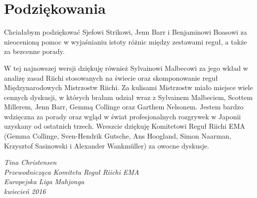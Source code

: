\section*{Podziękowania}

Chciałabym podziękować Sjefowi Strikowi, Jenn Barr i Benjaminowi Boasowi za nieocenioną pomoc w wyjaśnianiu istoty różnic między zestawami reguł, a także za bezcenne porady.

W tej najnowszej wersji dziękuję również Sylvainowi Malbecowi za jego wkład w analizę zasad Riichi stosowanych na świecie oraz skomponowanie reguł Międzynarodowych Mistrzostw Riichi.
Za kulisami Mistrzostw miało miejsce wiele cennych dyskusji, w których brałam udział wraz z Sylvainem Malbeciem, Scottem Millerem, Jenn Barr, Gemmą Collinge oraz Garthem Nelsonem.
Jestem bardzo wdzięczna za porady oraz wgląd w świat profesjonalnych rozgrywek w Japonii uzyskany od ostatnich trzech.
Wreszcie dziękuję Komitetowi Reguł Riichi EMA (Gemma Collinge, Sven-Hendrik Gutsche, Ans Hoogland, Simon Naarman, Krzysztof Sasinowski i Alexander Wankmüller) za owocne dyskusje.
\begin{flushright}
    \emph{
        Tina Christensen\\
        Przewodnicząca Komitetu Reguł Riichi EMA\\
        Europejska Liga Mahjonga\\
        kwiecień 2016
    }
\end{flushright}